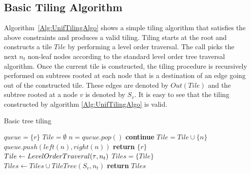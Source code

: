 \subsection{Basic Tiling Algorithm}
\label{sec:UnifTiling}
Algorithm~\ref{Alg:UnifTilingAlgo} shows a simple tiling algorithm that satisfies the above constraints and produces a valid tiling. 
Tiling starts at the root and constructs a tile $Tile$ by performing
a level order traversal. The call  picks the next $n_t$ non-leaf nodes according to the standard 
level order tree traversal algorithm. Once the current tile is constructed, 
the tiling procedure is recursively performed on subtrees rooted at each node that is a destination of an edge going out of the constructed 
tile. These edges are denoted by $Out(Tile)$ and the subtree rooted at a node $v$ is denoted by $S_v$.
It is easy to see that the tiling constructed by algorithm \ref{Alg:UnifTilingAlgo} is valid.
\begin{algorithm}
  \caption{Basic tree tiling}
  \label{Alg:UnifTilingAlgo}
  \begin{algorithmic}
        \State $queue = \{ r \}$
        \State $Tile = \emptyset$
          \State $n = queue.pop()$
              \State \textbf{continue}
          \EndIf
          \State $Tile = Tile \cup \{ n \}$
          \State $queue.push(left(n), right(n))$
        \EndWhile
      \EndProcedure
      \State {}
              \State \textbf{return} $\{ r \}$
          \EndIf
          \State $Tile \leftarrow LevelOrderTraveral(\operatorname{\tau}, n_t)$
          \State $Tiles =  \{ Tile \}$
              \State $Tiles \leftarrow Tiles \cup TileTree(S_v, n_t)$
          \EndFor
          \State \textbf{return} $Tiles$
      \EndProcedure
  \end{algorithmic}
\end{algorithm}


